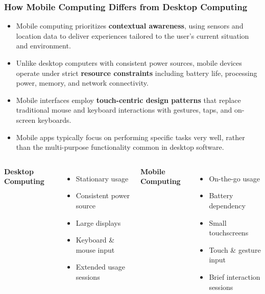 \documentclass{beamer}
\begin{document}
	\begin{frame}
		\frametitle{How Mobile Computing Differs from Desktop Computing}
		
		\begin{itemize}
			\item Mobile computing prioritizes \textbf{contextual awareness}, using sensors and location data to deliver experiences tailored to the user's current situation and environment.
			\item Unlike desktop computers with consistent power sources, mobile devices operate under strict \textbf{resource constraints} including battery life, processing power, memory, and network connectivity.
			\item Mobile interfaces employ \textbf{touch-centric design patterns} that replace traditional mouse and keyboard interactions with gestures, taps, and on-screen keyboards.
			\item Mobile apps typically focus on performing specific tasks very well, rather than the multi-purpose functionality common in desktop software.
		\end{itemize}
		
		\begin{columns}[t]
			\scriptsize
			\textbf{Desktop Computing}
			\begin{itemize}
				\item Stationary usage
				\item Consistent power source
				\item Large displays
				\item Keyboard \& mouse input
				\item Extended usage sessions
			\end{itemize}
			
			\textbf{Mobile Computing}
			\begin{itemize}
				\item On-the-go usage
				\item Battery dependency
				\item Small touchscreens
				\item Touch \& gesture input
				\item Brief interaction sessions
			\end{itemize}
		\end{columns}
		
	\end{frame}
	
\end{document}

